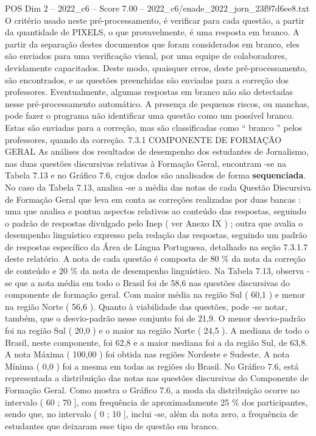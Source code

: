 \begin{textsample}{POS Dim 2 – 2022\_c6 – Score 7.00 – 2022\_c6/enade\_2022\_jorn\_23f97d6ee8.txt}
O critério usado neste pré-processamento, é verificar para cada questão, a partir da quantidade de PIXELS, o que provavelmente, é uma resposta em branco.
A partir da separação destes documentos que foram considerados em branco, eles são enviados para uma verificação visual, por uma equipe de colaboradores, devidamente capacitados.
Deste modo, quaisquer erros, deste pré-processamento, são encontrados, e as questões preenchidas são enviadas para a correção dos professores.
Eventualmente, algumas respostas em branco não são detectadas nesse pré-processamento automático.
A presença de pequenos riscos, ou manchas, pode fazer o programa não identificar uma questão como um possível branco.
Estas são enviadas para a correção, mas são classificadas como “ branco ” pelos professores, quando da correção. 7.3.1 COMPONENTE DE FORMAÇÃO GERAL As análises dos resultados de desempenho dos estudantes de Jornalismo, nas duas questões discursivas relativas à Formação Geral, encontram -se na Tabela 7.13 e no Gráfico 7.6, cujos dados são analisados de forma \textbf{sequenciada}.
No caso da Tabela 7.13, analisa -se a média das notas de cada Questão Discursiva de Formação Geral que leva em conta as correções realizadas por duas bancas : uma que analisa e pontua aspectos relativos ao conteúdo das respostas, seguindo o padrão de respostas divulgado pelo Inep ( ver Anexo IX ) ; outra que avalia o desempenho linguístico expresso pela redação das respostas, seguindo um padrão de respostas específico da Área de Língua Portuguesa, detalhado na seção 7.3.1.7 deste relatório.
A nota de cada questão é composta de 80 \% da nota da correção de conteúdo e 20 \% da nota de desempenho linguístico.
Na Tabela 7.13, observa -se que a nota média em todo o Brasil foi de 58,6 nas questões discursivas do componente de formação geral.
Com maior média na região Sul ( 60,1 ) e menor na região Norte ( 56,6 ).
Quanto à viabilidade das questões, pode -se notar, também, que o desvio-padrão nesse conjunto foi de 21,9.
O menor desvio-padrão foi na região Sul ( 20,0 ) e o maior na região Norte ( 24,5 ).
A mediana de todo o Brasil, neste componente, foi 62,8 e a maior mediana foi a da região Sul, de 63,8.
A nota Máxima ( 100,00 ) foi obtida nas regiões Nordeste e Sudeste.
A nota Mínima ( 0,0 ) foi a mesma em todas as regiões do Brasil.
No Gráfico 7.6, está representada a distribuição das notas nas questões discursivas do Componente de Formação Geral.
Como mostra o Gráfico 7.6, a moda da distribuição ocorre no intervalo ( 60 ; 70 ], com frequência de aproximadamente 25 \% dos participantes, sendo que, no intervalo ( 0 ; 10 ], inclui -se, além da nota zero, a frequência de estudantes que deixaram esse tipo de questão em branco.

\end{textsample}
